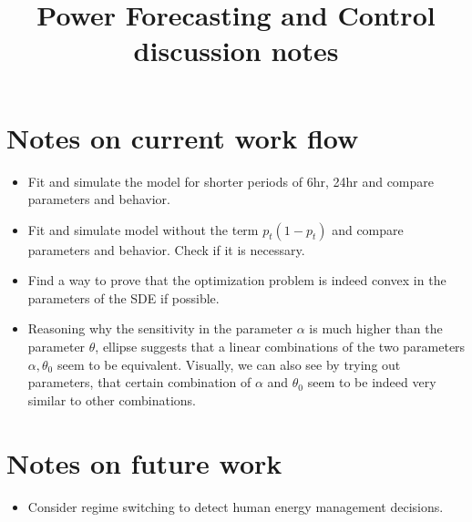 \documentclass[a4paper, 12pt]{article}
\title{Power Forecasting and Control\\ discussion notes}
\date{}
\begin{document}
\maketitle

\section{Notes on current work flow}
\begin{itemize}
\item Fit and simulate  the model for shorter periods of 6hr, 24hr and compare parameters and behavior.
\item Fit and simulate model without the term $p_t(1-p_t)$  and compare parameters and behavior. Check if it is necessary.
\item Find a way to  prove that the optimization problem is indeed convex in the parameters of the SDE if possible.
\item Reasoning why the sensitivity in the parameter $\alpha$ is much higher than the parameter $\theta$, ellipse suggests that a linear combinations of the two parameters $\alpha, \theta_0$ seem to be equivalent. Visually, we can also  see by trying out parameters, that certain combination of $\alpha$ and $\theta_0$ seem to be indeed very similar to other combinations.
\end{itemize}

\section{Notes on future work}
\begin{itemize}
\item Consider regime switching to detect human energy management decisions.
\end{itemize}

%
%
%
\end{document}

